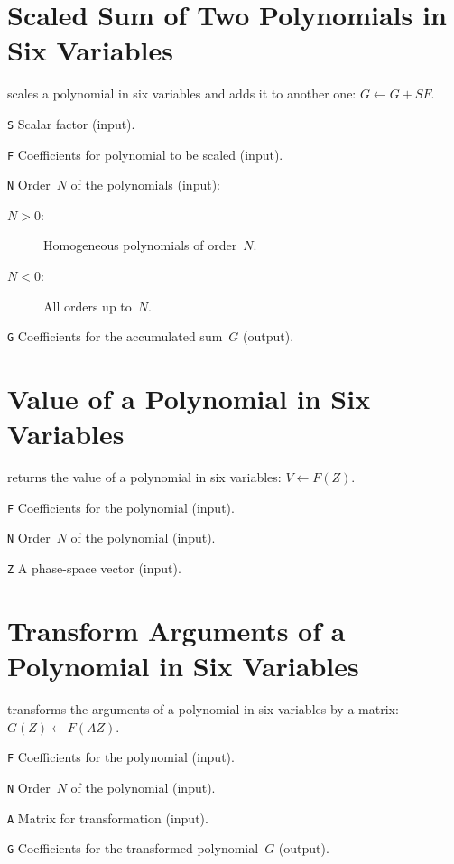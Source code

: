 \section{Scaled Sum of Two Polynomials in Six Variables}
\label{PA6SUM}
scales a polynomial in six variables and adds it to another one:
$G \leftarrow G + S F$.
\begin{mylist}
\item[\tt S]
Scalar factor (input).
\item[\tt F]
Coefficients for polynomial to be scaled (input).   
\item[\tt N]
Order~$N$ of the polynomials (input):
\begin{description}
\item[$N > 0$:] Homogeneous polynomials of order~$N$.
\item[$N < 0$:] All orders up to~$N$.
\end{description}
\item[\tt G]
Coefficients for the accumulated sum~$G$ (output).
\end{mylist}

\section{Value of a Polynomial in Six Variables}
\label{PA6VAL}
returns the value of a polynomial in six variables: $V \leftarrow F(Z)$.
\begin{mylist}
\item[\tt F]
Coefficients for the polynomial (input).   
\item[\tt N]
Order~$N$ of the polynomial (input).
\item[\tt Z]
A phase-space vector (input).
\end{mylist}

\section{Transform Arguments of a Polynomial in Six Variables}
\label{PA6XFM}
transforms the arguments of a polynomial in six variables by a matrix:
$G(Z) \leftarrow F(AZ)$.
\begin{mylist}
\item[\tt F]
Coefficients for the polynomial (input).   
\item[\tt N]
Order~$N$ of the polynomial (input).
\item[\tt A]
Matrix for transformation (input).
\item[\tt G]
Coefficients for the transformed polynomial~$G$ (output).
\end{mylist}

